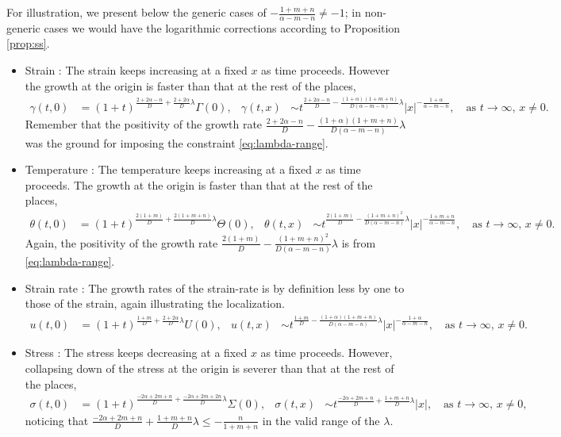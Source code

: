 \documentclass[a4paper,11pt]{article}
\def\red{\color{red}}
\theoremstyle{remark}
\begin{document}
{\red For illustration}, we present below the generic cases of $-\frac{1+m+n}{\alpha-m-n}\ne-1$; in non-generic cases we would have the logarithmic corrections according to Proposition \ref{prop:ss}.
\begin{itemize}
 \item Strain : The strain keeps increasing at a fixed $x$ as time proceeds. However the growth at the origin is faster than that at the rest of the places,
\begin{align*}
 \gamma(t,0) &= (1+t)^{\frac{2+2\alpha-n}{D} + \frac{2+2\alpha}{D}\lambda}\Gamma(0), &
 \gamma(t,x) &\sim t^{\frac{2+2\alpha-n}{D} - \frac{(1+\alpha)(1+m+n)}{D(\alpha-m-n)}\lambda}|x|^{-\frac{1+\alpha}{\alpha-m-n}}, \quad \text{as $t \rightarrow \infty$, $x\ne0$.}
\end{align*}
Remember that the positivity of the growth rate $\frac{2+2\alpha-n}{D} - \frac{(1+\alpha)(1+m+n)}{D(\alpha-m-n)}\lambda$ was the ground for imposing the constraint \eqref{eq:lambda-range}.
\item Temperature : The temperature keeps increasing at a fixed $x$ as time proceeds. The growth at the origin is faster than that at the rest of the places,
\begin{align*}
 \theta(t,0) &= (1+t)^{\frac{2(1+m)}{D} + \frac{2(1+m+n)}{D}\lambda}\Theta(0),&
 \theta(t,x) &\sim t^{\frac{2(1+m)}{D} - \frac{(1+m+n)^2}{D(\alpha-m-n)}\lambda}|x|^{-\frac{1+m+n}{\alpha-m-n}}, \quad \text{as $t \rightarrow \infty$, $x\ne0$.}
\end{align*}
Again, the positivity of the growth rate $\frac{2(1+m)}{D} - \frac{(1+m+n)^2}{D(\alpha-m-n)}\lambda$ is from \eqref{eq:lambda-range}.
\item Strain rate : The growth rates of the strain-rate is by definition less by one to those of the strain, again illustrating the localization.
\begin{align*}
 u(t,0) &= (1+t)^{\frac{1+m}{D} + \frac{2+2\alpha}{D}\lambda}U(0),&
 u(t,x) &\sim t^{\frac{1+m}{D} - \frac{(1+\alpha)(1+m+n)}{D(\alpha-m-n)}\lambda}|x|^{-\frac{1+\alpha}{\alpha-m-n}}, \quad \text{as $t \rightarrow \infty$, $x\ne0$.}
\end{align*}
\item Stress : The stress keeps decreasing at a fixed $x$ as time proceeds. However, collapsing down of the stress at the origin is severer than that at the rest of the places,
\begin{align*}
 \sigma(t,0) &= (1+t)^{\frac{-2\alpha+2m+n}{D} + \frac{-2\alpha+2m+2n}{D}\lambda}\Sigma(0), &
 \sigma(t,x) &\sim t^{\frac{-2\alpha+2m+n}{D} +\frac{1+m+n}{D}\lambda}|x|, \quad \text{as $t \rightarrow \infty$, $x\ne0$,}
\end{align*}
noticing that $\frac{-2\alpha+2m+n}{D} +\frac{1+m+n}{D}\lambda\le-\frac{n}{1+m+n}$ in the valid range of the $\lambda$.



\end{itemize}
\end{document}
